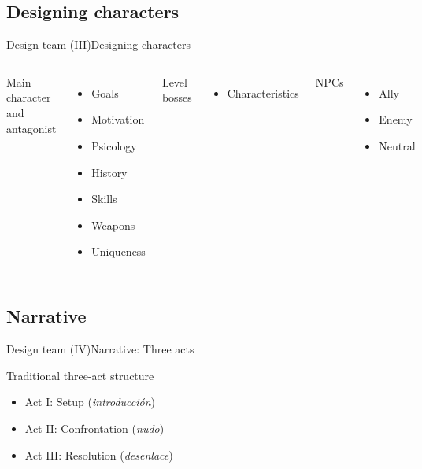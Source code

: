 \documentclass[10pt,compress]{beamer} %
\begin{document}
\subsection{Designing characters}
\begin{frame}{Design team (III)}{Designing characters}
    \begin{columns}
   Main character and antagonist
   \begin{itemize}
       \item Goals
       \item Motivation
       \item Psicology
       \item History
       \item Skills
       \item Weapons
       \item Uniqueness
   \end{itemize}

   Level bosses
   \begin{itemize}
        \item Characteristics
   \end{itemize}

   NPCs
   \begin{itemize}
        \item Ally
        \item Enemy
        \item Neutral
   \end{itemize}
    \end{columns}
\end{frame}

\subsection{Narrative}
\begin{frame}{Design team (IV)}{Narrative: Three acts}
   \begin{block}{Traditional three-act structure}
   \begin{itemize}
       \item Act I: Setup (\textit{introducción})
       \item Act II: Confrontation (\textit{nudo})
       \item Act III: Resolution (\textit{desenlace})
   \end{itemize}
   \end{block}
\end{frame}
\end{document}
